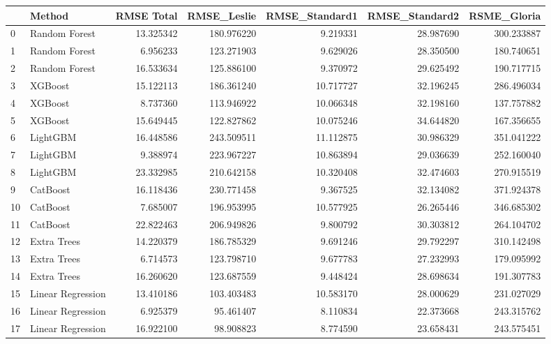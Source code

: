 \begin{tabular}{llrrrrr}
\toprule
{} &             Method &  RMSE Total &  RMSE\_Leslie &  RMSE\_Standard1 &  RMSE\_Standard2 &  RSME\_Gloria \\
\midrule
0  &      Random Forest &   13.325342 &   180.976220 &        9.219331 &       28.987690 &   300.233887 \\
1  &      Random Forest &    6.956233 &   123.271903 &        9.629026 &       28.350500 &   180.740651 \\
2  &      Random Forest &   16.533634 &   125.886100 &        9.370972 &       29.625492 &   190.717715 \\
3  &            XGBoost &   15.122113 &   186.361240 &       10.717727 &       32.196245 &   286.496034 \\
4  &            XGBoost &    8.737360 &   113.946922 &       10.066348 &       32.198160 &   137.757882 \\
5  &            XGBoost &   15.649445 &   122.827862 &       10.075246 &       34.644820 &   167.356655 \\
6  &           LightGBM &   16.448586 &   243.509511 &       11.112875 &       30.986329 &   351.041222 \\
7  &           LightGBM &    9.388974 &   223.967227 &       10.863894 &       29.036639 &   252.160040 \\
8  &           LightGBM &   23.332985 &   210.642158 &       10.320408 &       32.474603 &   270.915519 \\
9  &           CatBoost &   16.118436 &   230.771458 &        9.367525 &       32.134082 &   371.924378 \\
10 &           CatBoost &    7.685007 &   196.953995 &       10.577925 &       26.265446 &   346.685302 \\
11 &           CatBoost &   22.822463 &   206.949826 &        9.800792 &       30.303812 &   264.104702 \\
12 &        Extra Trees &   14.220379 &   186.785329 &        9.691246 &       29.792297 &   310.142498 \\
13 &        Extra Trees &    6.714573 &   123.798710 &        9.677783 &       27.232993 &   179.095992 \\
14 &        Extra Trees &   16.260620 &   123.687559 &        9.448424 &       28.698634 &   191.307783 \\
15 &  Linear Regression &   13.410186 &   103.403483 &       10.583170 &       28.000629 &   231.027029 \\
16 &  Linear Regression &    6.925379 &    95.461407 &        8.110834 &       22.373668 &   243.315762 \\
17 &  Linear Regression &   16.922100 &    98.908823 &        8.774590 &       23.658431 &   243.575451 \\
\bottomrule
\end{tabular}
